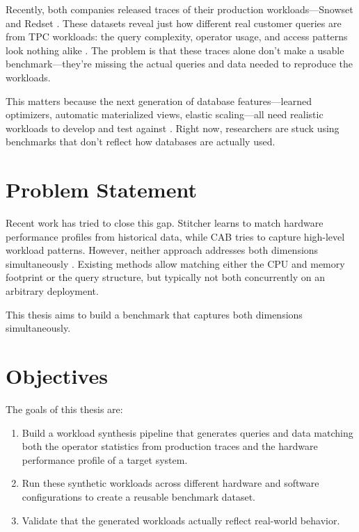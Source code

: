 \documentclass[12pt]{report}
\begin{document}
Recently, both companies released traces of their production workloads---Snowset \cite{snowset} and Redset \cite{redset}. These datasets reveal just how different real customer queries are from TPC workloads: the query complexity, operator usage, and access patterns look nothing alike \cite{pbench, snowset}. The problem is that these traces alone don't make a usable benchmark---they're missing the actual queries and data needed to reproduce the workloads.

This matters because the next generation of database features---learned optimizers, automatic materialized views, elastic scaling---all need realistic workloads to develop and test against \cite{redset, redbench}. Right now, researchers are stuck using benchmarks that don't reflect how databases are actually used.

\section{Problem Statement}
\label{sec:problem}

Recent work has tried to close this gap. Stitcher \cite{stitcher} learns to match hardware performance profiles from historical data, while CAB \cite{cab} tries to capture high-level workload patterns. However, neither approach addresses both dimensions simultaneously \cite{pbench}. Existing methods allow matching either the CPU and memory footprint or the query structure, but typically not both concurrently on an arbitrary deployment.

This thesis aims to build a benchmark that captures both dimensions simultaneously.

\section{Objectives}
\label{sec:objectives}

The goals of this thesis are:

\begin{enumerate}
    \item Build a workload synthesis pipeline that generates queries and data matching both the operator statistics from production traces and the hardware performance profile of a target system.
    
    \item Run these synthetic workloads across different hardware and software configurations to create a reusable benchmark dataset.
    
    \item Validate that the generated workloads actually reflect real-world behavior.
\end{enumerate}
\end{document}
